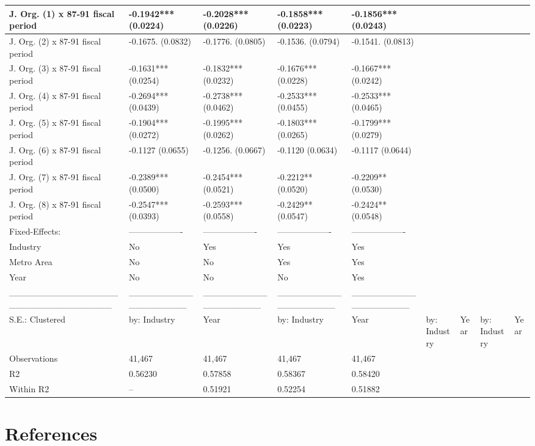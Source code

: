 \documentclass[
  12pt]{article}
\begin{document}
\begin{table}
\begin{tabular}[t]{l|l|l|l|l}
\hline
J. Org. (1) x 87-91 fiscal period & -0.1942*** (0.0224) & -0.2028*** (0.0226) & -0.1858*** (0.0223) & -0.1856*** (0.0243)\\
\hline
J. Org. (2) x 87-91 fiscal period & -0.1675. (0.0832) & -0.1776. (0.0805) & -0.1536. (0.0794) & -0.1541. (0.0813)\\
\hline
J. Org. (3) x 87-91 fiscal period & -0.1631*** (0.0254) & -0.1832*** (0.0232) & -0.1676*** (0.0228) & -0.1667*** (0.0242)\\
\hline
J. Org. (4) x 87-91 fiscal period & -0.2694*** (0.0439) & -0.2738*** (0.0462) & -0.2533*** (0.0455) & -0.2533*** (0.0465)\\
\hline
J. Org. (5) x 87-91 fiscal period & -0.1904*** (0.0272) & -0.1995*** (0.0262) & -0.1803*** (0.0265) & -0.1799*** (0.0279)\\
\hline
J. Org. (6) x 87-91 fiscal period & -0.1127 (0.0655) & -0.1256. (0.0667) & -0.1120 (0.0634) & -0.1117 (0.0644)\\
\hline
J. Org. (7) x 87-91 fiscal period & -0.2389*** (0.0500) & -0.2454*** (0.0521) & -0.2212** (0.0520) & -0.2209** (0.0530)\\
\hline
J. Org. (8) x 87-91 fiscal period & -0.2547*** (0.0393) & -0.2593*** (0.0558) & -0.2429** (0.0547) & -0.2424** (0.0548)\\
\hline
Fixed-Effects: & ------------------- & ------------------- & ------------------- & -------------------\\
\hline
Industry & No & Yes & Yes & Yes\\
\hline
Metro Area & No & No & Yes & Yes\\
\hline
Year & No & No & No & Yes\\
\hline
_________________________________ & ___________________ & ___________________ & ___________________ & ___________________\\
\hline
S.E.: Clustered & by: Industry & Year & by: Industry & Year & by: Industry & Year & by: Industry & Year\\
\hline
Observations & 41,467 & 41,467 & 41,467 & 41,467\\
\hline
R2 & 0.56230 & 0.57858 & 0.58367 & 0.58420\\
\hline
Within R2 & -- & 0.51921 & 0.52254 & 0.51882\\
\hline
\end{tabular}
\end{table}

\hypertarget{references}{%
\section*{References}\label{references}}

\renewcommand{\bibsection}{}

\end{document}
